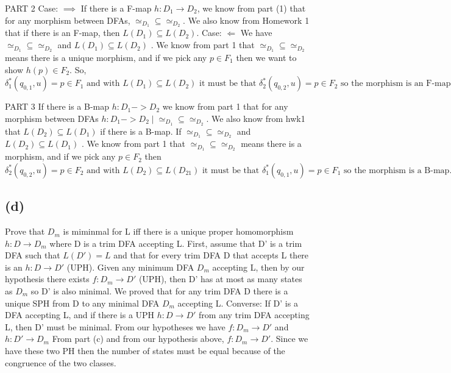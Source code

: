 \documentclass[12pt]{article}
\begin{document}
\medskip

PART 2\newline
Case: $\implies$ \newline
If there is a F-map $h: D_1 \rightarrow D_2$, we know from part (1) that 
for any morphism between DFAs, $\simeq_{D_1} \subseteq \simeq_{D_2}$.  
We also know from Homework 1 that if there is an F-map, then $L(D_1) \subseteq L(D_2)$. \newline
Case: $\Longleftarrow$ \newline
We have $\simeq_{D_1} \subseteq \simeq_{D_2}$ and $L(D_1) \subseteq 
L(D_2)$ . We know from part 1 that $\simeq_{D_1} \subseteq \simeq_{D_2}$
 means there is a unique morphism, and if we pick any $p \in F_1$ then
we want to show $h(p) \in F_2$. 
So, $\delta^{*}_1(q_{0,1}, u) = p \in F_1 \text{ and with } L(D_1) \subseteq 
L(D_2) \text{ it must be that } \delta^{*}_2(q_{0,2}, u) = p \in F_2 
\text{ so the morphism is an F-map. }$

\medskip

PART 3\newline
If there is a B-map $h: D_1 -> D_2$ we know from part 1 that for any morphism between DFAs $h: D_1 -> D_2 \mid \simeq_{D_1} \subseteq \simeq_{D_2}$.  We also know from hwk1 that $L(D_2) \subseteq L(D_1)$ if there is a B-map.\newline
If $\simeq_{D_1} \subseteq \simeq_{D_2}$ and $L(D_2) \subseteq L(D_1)$ . We know from part 1 that $\simeq_{D_1} \subseteq \simeq_{D_2}$ means there is a morphism, and if we pick any $p \in F_2$ then $\delta^{*}_2(q_{0,2}, u) = p \in F_2 \text{ and with } L(D_2) \subseteq L(D_21) \text{ it must be that } \delta^{*}_1(q_{0,1}, u) = p \in F_1 \text{ so the morphism is a B-map. }$\newline

\subsection*{(d)}
Prove that $D_m$ is miminmal for L iff there is a unique proper homomorphism
$h:D \rightarrow D_m$ where D is a trim DFA accepting L.\newline
		First, assume that D' is a trim DFA such that $L(D') = L$ and
		that for every trim DFA D that accepts L there is an $h: D \rightarrow D'$ (UPH).
		Given any minimum DFA $D_m$ accepting L, then by our hypothesis there
		exists $f:D_m \rightarrow D'$ (UPH), then D' has at most as many states 
                as $D_m$ so D' is also minimal.
	We proved that for any trim DFA D there is a unique SPH from D to any
	minimal DFA $D_m$ accepting L. \newline
Converse: If D' is a DFA accepting L, and  if there is a UPH $h: D \rightarrow D'$ from any trim
DFA accepting L, then D' must be minimal.
	From our hypotheses we have $f: D_m \rightarrow D'$ and $h: D' \rightarrow D_m$
	From part (c) and from our hypothesis above, $f:D_m \rightarrow D'$.
	Since we have these two PH then the number of states must be equal because
	of the congruence of the two classes.
\end{document}

